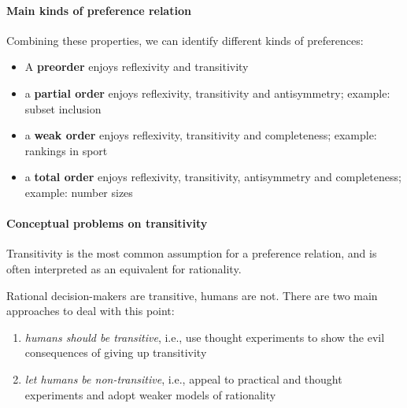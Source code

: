 \paragraph{Main kinds of preference relation} Combining these properties, we can identify different kinds of preferences:
\begin{itemize}
	\item A \textbf{preorder} enjoys reflexivity and transitivity
	
	\item a \textbf{partial order} enjoys reflexivity, transitivity and antisymmetry; example: subset inclusion
	
	\item a \textbf{weak order} enjoys reflexivity, transitivity and completeness; example: rankings in sport
	
	\item a \textbf{total order} enjoys reflexivity, transitivity, antisymmetry and completeness; example: number sizes
\end{itemize}

\paragraph{Conceptual problems on transitivity} Transitivity is the most common assumption for a preference relation, and is often interpreted as an equivalent for rationality.

Rational decision-makers are transitive, humans are not. There are two main approaches to deal with this point:
\begin{enumerate}
	\item \textit{humans should be transitive}, i.e., use thought experiments to show the evil consequences of giving up transitivity
	
	\item \textit{let humans be non-transitive}, i.e., appeal to practical and thought experiments and adopt weaker models of rationality
\end{enumerate}

